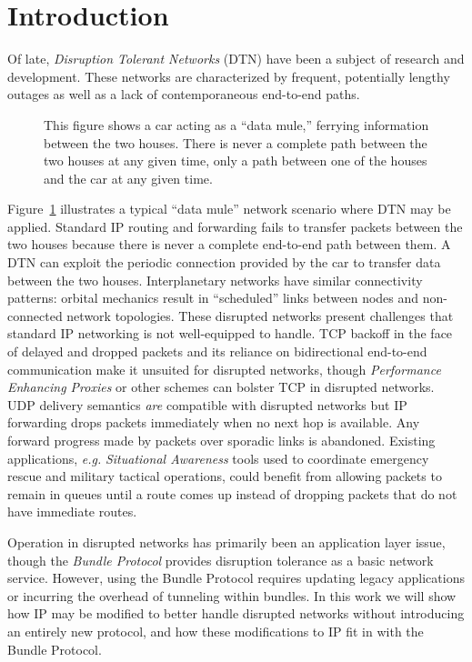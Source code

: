 \documentclass[10pt,letterpaper]{article}
\begin{document}
\section{Introduction}
\label{sec:intro}
Of late, {\em Disruption Tolerant Networks} (DTN) 
have been a subject of research and development\cite{dtn:rfc,5050:rfc}.
These networks are characterized by frequent, potentially lengthy outages
as well as a lack of contemporaneous end-to-end paths.
\begin{figure}
\centerline{
}
\caption{\footnotesize This figure shows a car acting as a ``data mule,''
ferrying information between the two houses. There is never a complete
path between the two houses at any given time, only a path between
one of the houses and the car at any given time.}
\label{figure:datamule}
\end{figure}
Figure~\ref{figure:datamule} illustrates a typical ``data mule''
network scenario where DTN may be applied. Standard IP routing and forwarding
fails to transfer packets between the two houses because there is never a
complete end-to-end path between them. A DTN can exploit the periodic
connection provided by the car to transfer data between the two houses.
Interplanetary networks have similar connectivity patterns:
orbital mechanics result in ``scheduled'' links between
nodes and non-connected network topologies.
These disrupted networks present challenges that standard IP networking
is not well-equipped to handle. 
TCP backoff in the face of delayed and dropped packets and its reliance
on bidirectional end-to-end communication make it unsuited for
disrupted networks, though {\em Performance Enhancing Proxies}
\cite{3135:rfc} or other schemes\cite{dttcp} can bolster
TCP in disrupted networks. UDP delivery
semantics {\em are} compatible with disrupted networks but
IP forwarding drops packets immediately when no next hop is available.
Any forward progress made by packets over sporadic links is abandoned.
Existing applications, {\em e.g.} {\em Situational Awareness} tools used
to coordinate emergency rescue and military tactical operations, could benefit
from allowing packets to remain in queues until a route comes up instead
of dropping packets that do not have immediate routes.

Operation in disrupted networks has primarily been an application layer issue,
though the {\em Bundle Protocol}\cite{5050:rfc} provides disruption
tolerance as a basic network service. However, using the Bundle Protocol
requires updating legacy applications or incurring the overhead of 
tunneling within bundles. In this work we will show how IP may be
modified to better handle disrupted networks without introducing an entirely
new protocol, and how these modifications to IP fit in with the Bundle Protocol.
\end{document}

